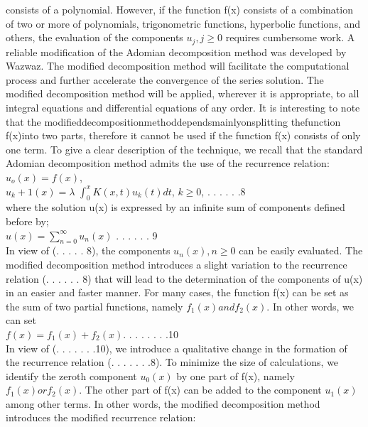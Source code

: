 \documentclass[12pt]{article}
\begin{document}
consists of a polynomial. However, if the function f(x) consists of a combination of two or more of polynomials, trigonometric functions, hyperbolic functions, and others, the evaluation of the components $u_j,j \geq 0$ requires cumbersome work. A reliable modiﬁcation of the Adomian decomposition method was developed by Wazwaz. The modiﬁed decomposition method will facilitate the computational process and further accelerate the convergence of the series solution. The modiﬁed decomposition method will be applied, wherever it is appropriate, to all integral equations and diﬀerential equations of any order. It is interesting to note that the modiﬁeddecompositionmethoddependsmainlyonsplitting thefunction f(x)into two parts, therefore it cannot be used if the function f(x) consists of only one term.
To give a clear description of the technique, we recall that the standard Adomian decomposition method admits the use of the recurrence relation:\\

$u_o(x) = f(x)$,\\
$u_k+1(x) = \lambda$ \(\int_{0}^{x} K(x,t) u_k(t) dt\), 	$k \geq 0$,			. . . . . .8\\

where the solution u(x) is expressed by an inﬁnite sum of components deﬁned before by;\\

$u(x) = \sum_{n=0}^{\infty}  u_n(x)$			. . . . . . 9\\

In view of (. . . . . 8), the components $u_n(x),n\geq 0$ can be easily evaluated. The modiﬁed decomposition method introduces a slight variation to the recurrence relation (. . . . . . 8) that will lead to the determination of the components of u(x) in an easier and faster manner. For many cases, the function f(x) can be set as the sum of two partial functions, namely $f_1(x) and f_2(x)$. In other words, we can set \\

$f(x) = f_1(x) + f_2(x)$.			. . . . . .  .10\\

In view of (. . . . . . .10), we introduce a qualitative change in the formation of the recurrence relation (. . . . . . .8). To minimize the size of calculations, we identify the zeroth component $u_0(x)$ by one part of f(x), namely $f_1(x) orf_2(x)$. The other part of f(x) can be added to the component $u_1(x)$ among other terms. In other words, the modiﬁed decomposition method introduces the modiﬁed recurrence relation: \\
\end{document}
